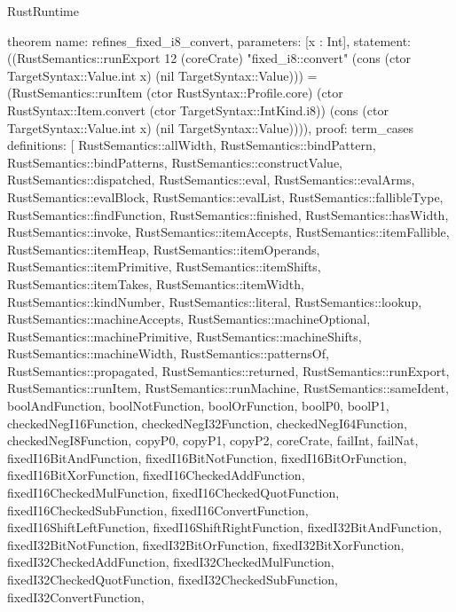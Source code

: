 \begin{lexlean}{RustRuntime}
\begin{semanticmodule}
theorem{
  name: refines_fixed_i8_convert,
  parameters: [x : Int],
  statement: ((RustSemantics::runExport 12 (coreCrate) "fixed_i8::convert" (cons (ctor TargetSyntax::Value.int x) (nil TargetSyntax::Value))) = (RustSemantics::runItem (ctor RustSyntax::Profile.core) (ctor RustSyntax::Item.convert (ctor TargetSyntax::IntKind.i8)) (cons (ctor TargetSyntax::Value.int x) (nil TargetSyntax::Value)))),
  proof: term_cases{
    definitions: [
      RustSemantics::allWidth,
      RustSemantics::bindPattern,
      RustSemantics::bindPatterns,
      RustSemantics::constructValue,
      RustSemantics::dispatched,
      RustSemantics::eval,
      RustSemantics::evalArms,
      RustSemantics::evalBlock,
      RustSemantics::evalList,
      RustSemantics::fallibleType,
      RustSemantics::findFunction,
      RustSemantics::finished,
      RustSemantics::hasWidth,
      RustSemantics::invoke,
      RustSemantics::itemAccepts,
      RustSemantics::itemFallible,
      RustSemantics::itemHeap,
      RustSemantics::itemOperands,
      RustSemantics::itemPrimitive,
      RustSemantics::itemShifts,
      RustSemantics::itemTakes,
      RustSemantics::itemWidth,
      RustSemantics::kindNumber,
      RustSemantics::literal,
      RustSemantics::lookup,
      RustSemantics::machineAccepts,
      RustSemantics::machineOptional,
      RustSemantics::machinePrimitive,
      RustSemantics::machineShifts,
      RustSemantics::machineWidth,
      RustSemantics::patternsOf,
      RustSemantics::propagated,
      RustSemantics::returned,
      RustSemantics::runExport,
      RustSemantics::runItem,
      RustSemantics::runMachine,
      RustSemantics::sameIdent,
      boolAndFunction,
      boolNotFunction,
      boolOrFunction,
      boolP0,
      boolP1,
      checkedNegI16Function,
      checkedNegI32Function,
      checkedNegI64Function,
      checkedNegI8Function,
      copyP0,
      copyP1,
      copyP2,
      coreCrate,
      failInt,
      failNat,
      fixedI16BitAndFunction,
      fixedI16BitNotFunction,
      fixedI16BitOrFunction,
      fixedI16BitXorFunction,
      fixedI16CheckedAddFunction,
      fixedI16CheckedMulFunction,
      fixedI16CheckedQuotFunction,
      fixedI16CheckedSubFunction,
      fixedI16ConvertFunction,
      fixedI16ShiftLeftFunction,
      fixedI16ShiftRightFunction,
      fixedI32BitAndFunction,
      fixedI32BitNotFunction,
      fixedI32BitOrFunction,
      fixedI32BitXorFunction,
      fixedI32CheckedAddFunction,
      fixedI32CheckedMulFunction,
      fixedI32CheckedQuotFunction,
      fixedI32CheckedSubFunction,
      fixedI32ConvertFunction,
}}
\end{semanticmodule}
\end{lexlean}
